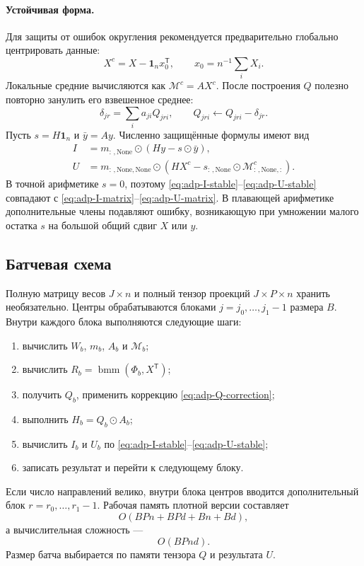 \paragraph{Устойчивая форма.}
Для защиты от ошибок округления рекомендуется предварительно глобально центрировать данные:
\[
X^{c}=X-\mathbf 1_nx_0^{\mathsf T},
\qquad
x_0=n^{-1}\sum_iX_i.
\]
Локальные средние вычисляются как $\mathcal M^{c}=AX^{c}$.
После построения $Q$ полезно повторно занулить его взвешенное среднее:
\begin{equation}
\delta_{jr}=\sum_i a_{ji}Q_{jri},
\qquad
Q_{jri}\leftarrow Q_{jri}-\delta_{jr}.
\label{eq:adp-Q-correction}
\end{equation}
Пусть $s=H\mathbf 1_n$ и $\bar y=Ay$. Численно защищённые формулы имеют вид
\begin{align}
I
&=
 m_{:\,,\mathrm{None}}
 \odot\left(Hy-s\odot\bar y\right),
\label{eq:adp-I-stable}
\\
U
&=
 m_{:\,,\mathrm{None},\mathrm{None}}
 \odot\left(
 HX^{c}-s_{:\,,\mathrm{None}}\odot
 \mathcal M^{c}_{:\,,\mathrm{None},:}
 \right).
\label{eq:adp-U-stable}
\end{align}
В точной арифметике $s=0$, поэтому
\eqref{eq:adp-I-stable}--\eqref{eq:adp-U-stable}
совпадают с \eqref{eq:adp-I-matrix}--\eqref{eq:adp-U-matrix}.
В плавающей арифметике дополнительные члены подавляют ошибку,
возникающую при умножении малого остатка $s$ на большой общий сдвиг $X$ или $y$.

\subsection{Батчевая схема}

Полную матрицу весов $J\times n$ и полный тензор проекций
$J\times P\times n$ хранить необязательно. Центры обрабатываются блоками
$j=j_0,\ldots,j_1-1$ размера $B$. Внутри каждого блока выполняются следующие шаги:
\begin{enumerate}
\item вычислить $W_b$, $m_b$, $A_b$ и $\mathcal M_b$;
\item вычислить $R_b=\operatorname{bmm}(\Phi_b,X^{\mathsf T})$;
\item получить $Q_b$, применить коррекцию \eqref{eq:adp-Q-correction};
\item выполнить $H_b=Q_b\odot A_b$;
\item вычислить $I_b$ и $U_b$ по
      \eqref{eq:adp-I-stable}--\eqref{eq:adp-U-stable};
\item записать результат и перейти к следующему блоку.
\end{enumerate}
Если число направлений велико, внутри блока центров вводится дополнительный блок
$r=r_0,\ldots,r_1-1$. Рабочая память плотной версии составляет
\[
O(BPn+BPd+Bn+Bd),
\]
а вычислительная сложность ---
\[
O(BPnd).
\]
Размер батча выбирается по памяти тензора $Q$ и результата $U$.

